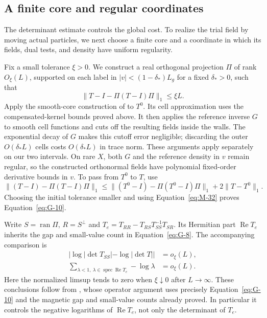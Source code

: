 \subsection{A finite core and regular coordinates}

The determinant estimate controls the global cost. To realize the trial
field by moving actual particles, we next choose a finite core and a
coordinate in which its fields, dual tests, and density have uniform
regularity.

Fix a small tolerance $\xi>0$. We construct a real orthogonal
projection $\Pi$ of rank $O_\xi(L)$, supported on each label in
$|v|<(1-\delta_*)L_g$ for a fixed $\delta_*>0$, such that
\begin{equation}\label{eq:G-10}
 \|T-I-\Pi(T-I)\Pi\|_1\le\xi L.
\end{equation}
Apply the smooth-core construction of \cite[Lemma~3.11]{Electric}
to $T^0$. Its cell approximation uses the compensated-kernel bounds
proved above. It then applies the reference inverse $G$ to smooth
cell functions and cuts off the resulting fields inside the walls.
The exponential decay of $G$ makes this cutoff error negligible;
discarding the outer $O(\delta_*L)$ cells costs $O(\delta_*L)$ in
trace norm. These arguments apply separately on our two intervals.
On rare $X$, both $G$ and the reference density in $v$ remain regular,
so the constructed orthonormal fields have polynomial fixed-order
derivative bounds in $v$. To pass from $T^0$ to $T$, use
\[
 \|(T-I)-\Pi(T-I)\Pi\|_1
 \le \|(T^0-I)-\Pi(T^0-I)\Pi\|_1+2\|T-T^0\|_1.
\]
Choosing the initial tolerance smaller and using
Equation~\eqref{eq:M-32} proves Equation~\eqref{eq:G-10}.

Write $S=\operatorname{ran}\Pi$, $R=S^\perp$ and
$T_e=T_{RR}-T_{RS}T_{SS}^{-1}T_{SR}$. Its Hermitian part
$\operatorname{Re}T_e$ inherits the gap and small-value count in
Equation~\eqref{eq:G-8}. The accompanying comparison is
\begin{equation}\label{eq:G-11}
 \begin{aligned}
 |\log|\det T_{SS}|-\log|\det T||&=o_\xi(L),\\
 \sum_{\lambda<1,\ \lambda\in\operatorname{spec}\operatorname{Re}T_e}
             -\log\lambda&=o_\xi(L).
 \end{aligned}
\end{equation}
Here the normalized limsup tends to zero when $\xi\downarrow0$
after $L\to\infty$. These conclusions follow from
\cite[Lemma~3.12]{Electric}, whose operator argument uses precisely
Equation~\eqref{eq:G-10} and the magnetic gap and small-value counts
already proved. In particular it controls the negative logarithms of
$\operatorname{Re}T_e$, not only the determinant of $T_e$.

